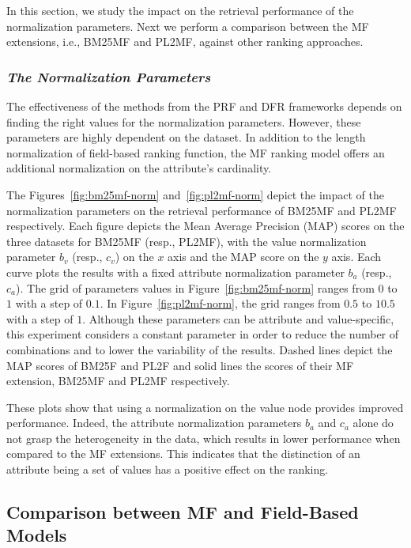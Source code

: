 In this section, we study the impact on the retrieval performance of the normalization parameters. Next we perform a comparison between the MF extensions, i.e., BM25MF and PL2MF, against other ranking approaches. 

\subsubsection{\emph{The Normalization Parameters}}
\label{sec:norm-exp}

The effectiveness of the methods from the PRF and DFR frameworks depends on finding the right values for the normalization parameters. However, these parameters are highly dependent on the dataset.
In addition to the length normalization of field-based ranking function, the MF ranking model offers an additional normalization on the attribute's cardinality.

The Figures~\ref{fig:bm25mf-norm} and~\ref{fig:pl2mf-norm} depict the impact of the normalization parameters on the retrieval performance of BM25MF and PL2MF respectively. Each figure depicts the Mean Average Precision (MAP) scores on the three datasets for BM25MF (resp., PL2MF), with the value normalization parameter $b_v$ (resp., $c_v$) on the $x$ axis and the MAP score on the $y$ axis. Each curve plots the results with a fixed attribute normalization parameter $b_a$ (resp., $c_a$). The grid of parameters values in Figure~\ref{fig:bm25mf-norm} ranges from $0$ to $1$ with a step of $0.1$. In Figure~\ref{fig:pl2mf-norm}, the grid ranges from $0.5$ to $10.5$ with a step of $1$. Although these parameters can be attribute and value-specific, this experiment considers a constant parameter in order to reduce the number of combinations and to lower the variability of the results. Dashed lines depict the MAP scores of BM25F and PL2F and solid lines the scores of their MF extension, BM25MF and PL2MF respectively.

These plots show that using a normalization on the value node provides improved performance. Indeed, the attribute normalization parameters $b_a$ and $c_a$ alone do not grasp the heterogeneity in the data, which results in lower performance when compared to the MF extensions. This indicates that the distinction of an attribute being a set of values has a positive effect on the ranking.





\subsection{Comparison between MF and Field-Based Models}
\label{sec:mf-field-cmp}

